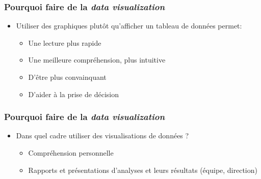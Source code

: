 \begin{frame}\frametitle{Pourquoi faire de la \textit{data visualization}}
   \begin{itemize}
      \item Utiliser des graphiques plutôt qu'afficher un tableau de données permet:
      \begin{itemize}
         \item Une lecture plus rapide
         \item Une meilleure compréhension, plus intuitive
         \item D'être plus convainquant %
         \item D'aider à la prise de décision
      \end{itemize}
   \end{itemize}
\end{frame}



\begin{frame}\frametitle{Pourquoi faire de la \textit{data visualization}}  %
   \begin{itemize}
      \item Dans quel cadre utiliser des visualisations de données ?
      \begin{itemize}
          \item Compréhension personnelle
          \item Rapports et présentations d'analyses et leurs résultats (équipe, direction)
      \end{itemize}
   \end{itemize}
\end{frame}

